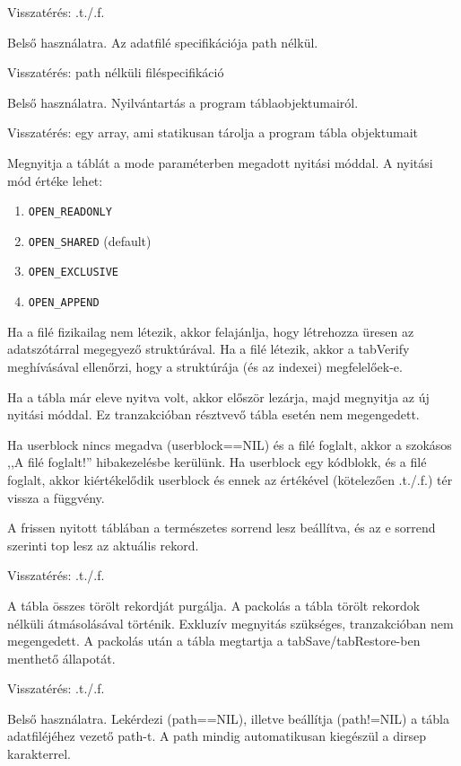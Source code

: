 Visszatérés: .t./.f.
 

Belső használatra. 
Az adatfilé specifikációja path nélkül.

Visszatérés: path nélküli filéspecifikáció 

 
Belső használatra. 
Nyilvántartás a program táblaobjektumairól.

Visszatérés: egy array, ami statikusan tárolja a program tábla objektumait



Megnyitja a táblát a mode paraméterben megadott nyitási móddal.
A nyitási mód értéke lehet:
\begin{enumerate}
\item \verb!OPEN_READONLY!
\item \verb!OPEN_SHARED! (default)
\item \verb!OPEN_EXCLUSIVE!
\item \verb!OPEN_APPEND!
\end{enumerate}
Ha a filé fizikailag nem létezik, akkor felajánlja, hogy
létrehozza üresen az adatszótárral megegyező struktúrával.
Ha a filé létezik, akkor a tabVerify meghívásával ellenőrzi,
hogy a struktúrája (és az indexei) megfelelőek-e.

Ha a tábla már eleve nyitva volt, akkor először lezárja, 
majd megnyitja az új nyitási móddal. Ez tranzakcióban
résztvevő tábla esetén nem megengedett.

Ha userblock nincs megadva (userblock==NIL) és a filé foglalt,
akkor a szokásos ,,A filé foglalt!'' hibakezelésbe kerülünk.
Ha userblock egy kódblokk, és a filé foglalt, akkor kiértékelődik
userblock és ennek az értékével (kötelezően .t./.f.) tér vissza
a függvény.

A frissen nyitott táblában a természetes sorrend lesz
beállítva, és az e sorrend szerinti top lesz az aktuális
rekord.

Visszatérés: .t./.f.



A tábla összes törölt rekordját purgálja. A packolás
a tábla törölt rekordok nélküli átmásolásával történik.
Exkluzív megnyitás szükséges, tranzakcióban nem megengedett.
A packolás után a tábla megtartja a tabSave/tabRestore-ben
menthető állapotát.

Visszatérés: .t./.f.


Belső használatra. 
Lekérdezi (path==NIL), illetve beállítja (path!=NIL) 
a tábla adatfiléjéhez vezető path-t. A path mindig 
automatikusan kiegészül a dirsep karakterrel.

